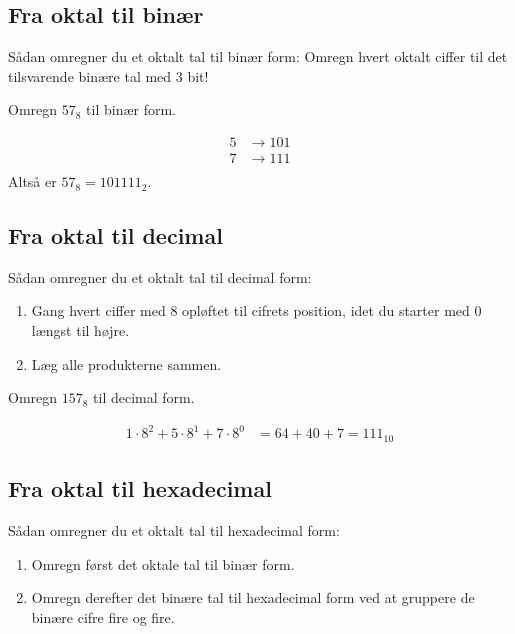 \subsection*{Fra oktal til binær}
Sådan omregner du et oktalt tal til binær form: Omregn hvert oktalt ciffer til det tilsvarende binære tal med 3 bit!

\begin{example}Omregn \(57_8\) til binær form.

\begin{solution}
\[
\begin{aligned}
5 & \rightarrow 101 \\
7 & \rightarrow 111 \\
\end{aligned}
\]
Altså er \(57_8 = 101111_2\). \end{solution}

\end{example}

\subsection*{Fra oktal til decimal}
Sådan omregner du et oktalt tal til decimal form:
\begin{enumerate}
    \item Gang hvert ciffer med 8 opløftet til cifrets position, idet du starter med 0 længst til højre.
    \item Læg alle produkterne sammen.
\end{enumerate}

\begin{example}Omregn \(157_8\) til decimal form.

\begin{solution}
    
\[
\begin{aligned}
1 \cdot 8^2 + 5 \cdot 8^1 + 7 \cdot 8^0 & = 64 + 40 + 7 = 111_{10}
\end{aligned}
\] \end{solution}

\end{example}

\subsection*{Fra oktal til hexadecimal}
Sådan omregner du et oktalt tal til hexadecimal form:
\begin{enumerate}
    \item Omregn først det oktale tal til binær form.
    \item Omregn derefter det binære tal til hexadecimal form ved at gruppere de binære cifre fire og fire.
\end{enumerate}

